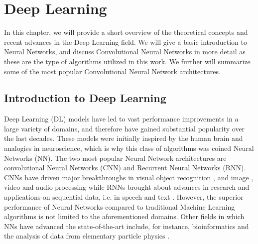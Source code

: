 
\chapter{Deep Learning} %

\label{Chapter3} %


In this chapter, we will provide a short overview of the theoretical concepts and recent advances in the Deep Learning field. We will give a basic introduction to Neural Networks, and discuss Convolutional Neural Networks in more detail as these are the type of algorithms utilized in this work. We further will summarize some of the most popular Convolutional Neural Network architectures.




\section{Introduction to Deep Learning}

Deep Learning (DL) models have led to vast performance improvements in a large variety of domains, and therefore have gained substantial popularity over the last decades. These models were initially inspired by the human brain and analogies in neuroscience, which is why this class of algorithms was coined Neural Networks (NN). The two most popular Neural Network architectures are convolutional Neural Networks (CNN) and Recurrent Neural Networks (RNN). CNNs have driven major breakthroughs in visual object recognition \parencite{krizhevsky2012}, and image \parencite{zhang2015}, video \parencite{tompson2014} and audio \parencite{hinton2012} processing while RNNs brought about advances in research and applications on sequential data, i.e. in speech and text \parencite{collobert2011}. However, the superior performance of Neural Networks compared to traditional Machine Learning algorithms is not limited to the aforementioned domains. Other fields in which NNs have advanced the state-of-the-art include, for instance, bioinformatics \parencite{junshui2015} and the analysis of data from elementary particle physics \parencite{ciodaroc2012}.

